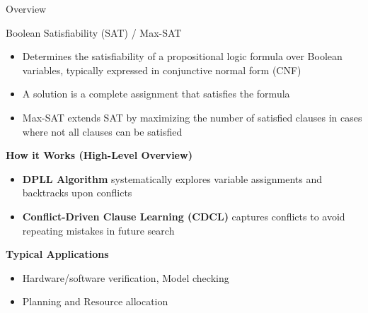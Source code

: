 \documentclass{cons-beamer}
\begin{document}
\begin{frame}{Overview}
\end{frame}


\begin{frame}{Boolean Satisfiability (SAT) / Max-SAT}
  \begin{itemize}
    \item Determines the satisfiability of a propositional logic formula over Boolean variables, typically expressed in conjunctive normal form (CNF)
    \item A solution is a complete assignment that satisfies the formula
    \item Max-SAT extends SAT by maximizing the number of satisfied clauses in cases where not all clauses can be satisfied
  \end{itemize}
  \vfill

  \textbf{How it Works (High-Level Overview)} $ $\\
  \begin{itemize}
    \item \textbf{DPLL Algorithm} systematically explores variable assignments and backtracks upon conflicts
    \item \textbf{Conflict-Driven Clause Learning (CDCL)} captures conflicts to avoid repeating mistakes in future search
  \end{itemize}
  \vfill

  \textbf{Typical Applications}
  \begin{itemize}
    \item Hardware/software verification, Model checking
    \item Planning and Resource allocation
  \end{itemize}
\end{frame}
\end{document}
